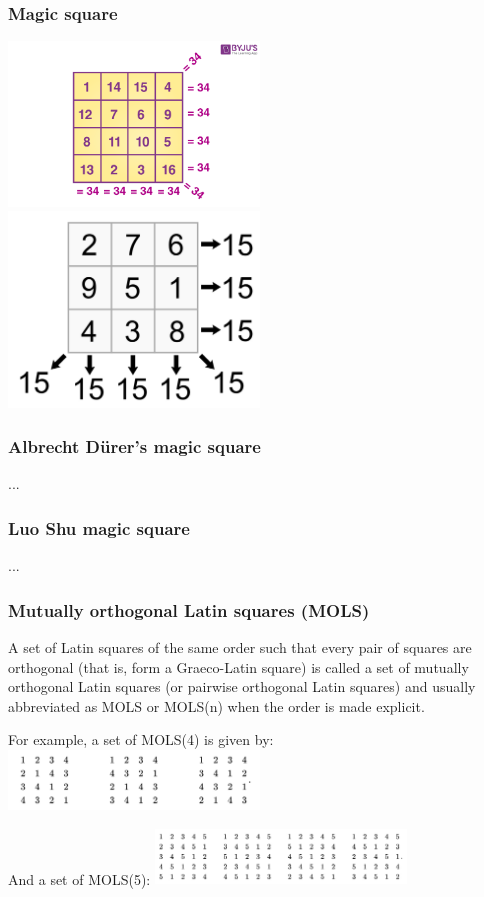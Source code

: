 \documentclass{beamer}
\begin{document}
\begin{frame}
\begin{frame}
\frametitle{Magic square}
\includegraphics[width=0.5\textwidth]{img13}
\includegraphics[width=0.5\textwidth]{img14}
\end{frame}

\begin{frame}
\frametitle{Albrecht Dürer's magic square}
...
\end{frame}

\begin{frame}
\frametitle{Luo Shu magic square}
...
\end{frame}

\begin{frame}
\frametitle{Mutually orthogonal Latin squares (MOLS)}
A set of Latin squares of the same order such that every pair of squares are orthogonal (that is, form a Graeco-Latin square) is called a set of mutually orthogonal Latin squares (or pairwise orthogonal Latin squares) and usually abbreviated as MOLS or MOLS(n) when the order is made explicit.

For example, a set of MOLS(4) is given by:
\includegraphics[width=0.5\textwidth]{img15}

And a set of MOLS(5):
\includegraphics[width=0.5\textwidth]{img16}
\end{frame}


\end{frame}
\end{document}
